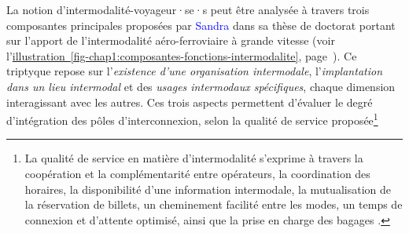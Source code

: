 \begin{refsegment}
La notion d’intermodalité-voyageur·se·s peut être analysée à travers trois composantes principales proposées par \textcolor{blue}{Sandra} \textcolor{blue}{\textcite[167]{bozzani_grandes_2006}} dans sa thèse de doctorat portant sur l’apport de l’intermodalité aéro-ferroviaire à grande vitesse (voir l'\hyperref[fig-chap1:composantes-fonctions-intermodalite]{illustration~\ref{fig-chap1:composantes-fonctions-intermodalite}}, page~\pageref{fig-chap1:tad-murdoch}). Ce triptyque repose sur l’\textsl{existence d’une organisation intermodale}, l’\textsl{implantation dans un lieu intermodal} et des \textsl{usages intermodaux spécifiques}, chaque dimension interagissant avec les autres. Ces trois aspects permettent d’évaluer le degré d’intégration des pôles d’interconnexion, selon la qualité de service proposée\footnote{
    La qualité de service en matière d’intermodalité s’exprime à travers la coopération et la complémentarité entre opérateurs, la coordination des horaires, la disponibilité d’une information intermodale, la mutualisation de la réservation de billets, un cheminement facilité entre les modes, un temps de connexion et d’attente optimisé, ainsi que la prise en charge des bagages \textcolor{blue}{\autocites[65]{bozzani_intermodalite_2005}[167]{bozzani_grandes_2006}}.
}
\end{refsegment}
